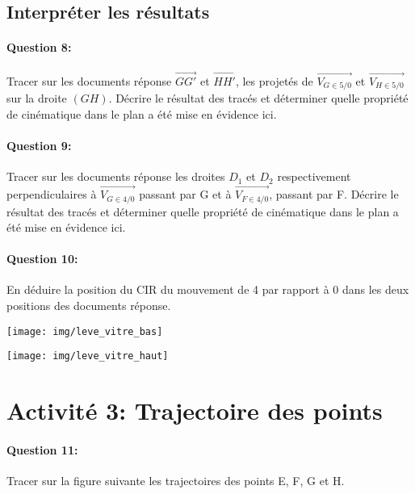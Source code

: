 \reponse[1]

\subsection{Interpréter les résultats}
	
\paragraph{Question 8:} Tracer sur les documents réponse $\overrightarrow{GG'}$ et $\overrightarrow{HH'}$, les projetés de $\overrightarrow{V_{G\in 5/0}}$ et $\overrightarrow{V_{H\in 5/0}}$ sur la droite $(GH)$. Décrire le résultat des tracés et déterminer quelle propriété de cinématique dans le plan a été mise en évidence ici.
	
\paragraph{Question 9:} Tracer sur les documents réponse les droites $D_1$ et $D_2$ respectivement perpendiculaires à $\overrightarrow{V_{G\in 4/0}}$ passant par G et à $\overrightarrow{V_{F\in 4/0}}$, passant par F. Décrire le résultat des tracés et déterminer quelle propriété de cinématique dans le plan a été mise en évidence ici.

\paragraph{Question 10:} En déduire la position du CIR du mouvement de 4 par rapport à 0 dans les deux positions des documents réponse.

\texttt{[image: img/leve\_vitre\_bas]}

\vspace{2cm}

\texttt{[image: img/leve\_vitre\_haut]}

\section{Activité 3: Trajectoire des points}

\paragraph{Question 11:} Tracer sur la figure suivante les trajectoires des points E, F, G et H.

\vspace{1cm}

